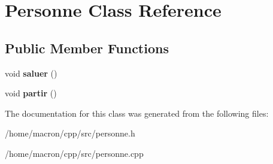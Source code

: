 \hypertarget{classPersonne}{}\section{Personne Class Reference}
\label{classPersonne}
\subsection*{Public Member Functions}
\begin{DoxyCompactItemize}
\item 
\mbox{\label{classPersonne_a55f1b2e44b73b284ad50fee69f5d1d0b}} 
void {\bfseries saluer} ()
\item 
\mbox{\label{classPersonne_a89798bbe0f75b50f6455b909088f4234}} 
void {\bfseries partir} ()
\end{DoxyCompactItemize}


The documentation for this class was generated from the following files\+:\begin{DoxyCompactItemize}
\item 
/home/macron/cpp/src/personne.\+h\item 
/home/macron/cpp/src/personne.\+cpp\end{DoxyCompactItemize}
